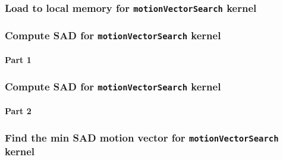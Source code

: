 \begin{frame}
  \frametitle{Load to local memory for \lstinline{motionVectorSearch}
    kernel}
  \begin{exampleblock}{}
    
    {\color{red} }
  \end{exampleblock}
\end{frame}

\begin{frame}
  \frametitle{Compute SAD for \lstinline{motionVectorSearch} kernel}
  \framesubtitle{Part 1}
  \begin{exampleblock}{}
    
    \qquad {}
    
  \end{exampleblock}
\end{frame}

\begin{frame}
  \frametitle{Compute SAD for \lstinline{motionVectorSearch} kernel}
  \framesubtitle{Part 2}
  \begin{exampleblock}{}
    
  \end{exampleblock}
\end{frame}

\begin{frame}
  \frametitle{Find the min SAD motion vector for
    \lstinline{motionVectorSearch} kernel}
  \begin{exampleblock}{}
    
  \end{exampleblock}
\end{frame}

